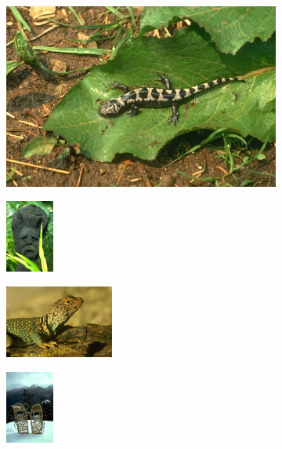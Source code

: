 \documentclass[journal]{IEEEtran}
\begin{document}
\begin{figure}[!ht] 
   
    \begin{subfigure}[t]{\textwidth+20pt\relax}
    	\centering
    	\includegraphics[width=\dimexpr\linewidth-20pt\relax]{175083} 
    \end{subfigure}      
    \begin{subfigure}[b]{0.23\textwidth}
    	\centering
        \includegraphics[height=67.68857pt]{101084}
    \end{subfigure}
    \begin{subfigure}[b]{0.23\textwidth}
    	\centering
        \includegraphics[height=67.68857pt]{41096}
    \end{subfigure}
    \begin{subfigure}[b]{0.23\textwidth}
    	\centering
        \includegraphics[height=67.68857pt]{2018}
    \end{subfigure} \\ \vspace{-5pt}      
    

\end{figure}
\end{document}
